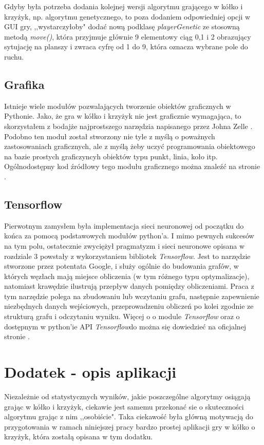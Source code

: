 \documentclass[licencjacka]{pracamgr}
\begin{document}
Gdyby była potrzeba dodania kolejnej wersji algorytmu grającego w kółko i krzyżyk, np. algorytmu genetycznego, to poza dodaniem odpowiedniej opcji w GUI gry, ,,wystarczyłoby" dodać nową podklasę \textit{playerGenetic} ze stosowną metodą \textit{move()}, która przyjmuje głównie 9 elementowy ciąg 0,1 i 2 obrazujący sytujację na planszy i zwraca cyfrę od 1 do 9, która oznacza wybrane pole do ruchu.  

\section{Grafika}
Istnieje wiele modułów pozwalających tworzenie obiektów graficznych w Pythonie. Jako, że gra w kółko i krzyżyk nie jest graficznie wymagająca, to skorzystałem z bodajże najprostszego narzędzia napisanego przez Johna Zelle \cite{Graphics}. Podobno ten moduł został stworzony nie tyle z myślą o poważnych zastosowaniach graficznych, ale z myślą żeby uczyć programowania obiektowego na bazie prostych graficzyncyh obiektów typu punkt, linia, koło itp.  Ogólnodostępny kod źródłowy tego modułu graficznego można znaleźć na stronie \cite{Graphics}.

\section{Tensorflow}
Pierwotnym zamysłem była implementacja  sieci neuronowej od początku do końca za pomocą podstawowych modułów python'a. I mimo pewnych sukcesów na tym polu, ostatecznie zwyciężył pragmatyzm i sieci neuronowe opisana w rozdziale 3 powstały z wykorzystaniem bibliotek \textit{Tensorflow}. Jest to narzędzie stworzone przez potentata Google, i służy ogólnie do budowania grafów, w których węzłach mają miejsce obliczenia (w tym różnego typu optymalizacje), natomiast krawędzie ilustrują przepływ danych pomiędzy obliczeniami. Praca z tym narzędzie polega na zbudowaniu lub wczytaniu grafu, następnie zapewnienie niezbędnych danych wejściowych, przeprowadzeniu obliczeń po kolei zgodnie ze strukturą grafu i odczytaniu wyniku.  Więcej o o module \textit{Tensorflow} oraz o dostępnym w python'ie API  \textit{Tensorflow}do  można się dowiedzieć na oficjalnej stronie \cite{TF}.


\chapter{Dodatek - opis aplikacji}

Niezależnie od statystycznych wyników, jakie poszczególne algorytmy osiągają grając w kółko i krzyżyk, ciekawie jest samemu przekonać sie o 
skuteczności algorytmu grając z nim ,,osobiście". Taka ciekawość była główną motywacją do przygotowania w ramach niniejszej pracy 
bardzo prostej aplikacji gry w kółko o krzyżyk, która zostałą opisana w tym dodatku. \\
\end{document}
